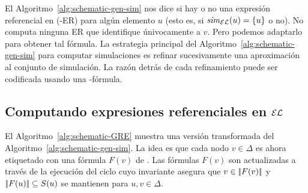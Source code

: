 El Algoritmo~\ref{alg:schematic-gen-sim} nos dice si hay o no una expresi\'on referencial en \EL (\EL-ER) para alg\'un elemento $u$ (esto es, si
${\it sim}_{\mathcal{EL}}(u) = \{u\}$ o no). No computa ninguna ER que identifique \'univocamente a $v$. Pero
podemos adaptarlo para obtener tal f\'ormula.
La estrategia principal del Algoritmo~\ref{alg:schematic-gen-sim} para computar simulaciones es refinar sucesivamente una aproximaci\'on al conjunto de simulaci\'on.
La raz\'on detr\'as de cada refinamiento puede ser codificada usando una \EL-f\'ormula.

\subsection{Computando expresiones referenciales en $\mathcal{EL}$}


El Algoritmo~\ref{alg:schematic-GRE} muestra una versi\'on transformada del 
Algoritmo~\ref{alg:schematic-gen-sim}. La idea es que cada nodo
$v\in\Delta$ es ahora etiquetado con una f\'ormula
$F(v)$ de \EL. Las f\'ormulas $F(v)$ son actualizadas a trav\'es de la ejecuci\'on del ciclo cuyo invariante asegura que $v \in
|\!|F(v)|\!|$ y $|\!|F(u)|\!| \subseteq S(u)$ se mantienen para
$u,v\in\Delta$.

%
%
%
%


